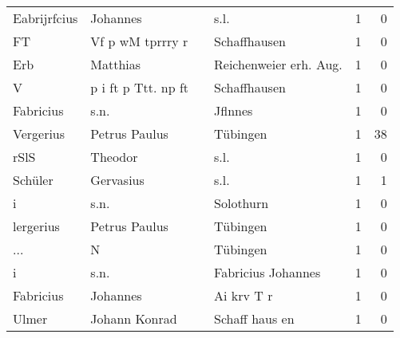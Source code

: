 \begin{tabular}{llllrr}
             Eabrijrfcius &                           Johannes &             &                                        s.l. &          1 &         0 \\
                       FT &                   Vf p wM tprrry r &             &                                Schaffhausen &          1 &         0 \\
                      Erb &                           Matthias &             &                     Reichenweier erh. Aug.  &          1 &         0 \\
                        V &                p i ft p Ttt. np ft &             &                                Schaffhausen &          1 &         0 \\
                Fabricius &                               s.n. &             &                                     Jflnnes &          1 &         0 \\
                Vergerius &                      Petrus Paulus &             &                                    Tübingen &          1 &        38 \\
                     rSlS &                            Theodor &             &                                        s.l. &          1 &         0 \\
                  Schüler &                          Gervasius &             &                                        s.l. &          1 &         1 \\
                        i &                               s.n. &             &                                   Solothurn &          1 &         0 \\
                lergerius &                      Petrus Paulus &             &                                    Tübingen &          1 &         0 \\
                      ... &                                  N &             &                                    Tübingen &          1 &         0 \\
                        i &                               s.n. &             &                          Fabricius Johannes &          1 &         0 \\
                Fabricius &                           Johannes &             &                                  Ai krv T r &          1 &         0 \\
                    Ulmer &                      Johann Konrad &             &                              Schaff haus en &          1 &         0 \\

\end{tabular}

